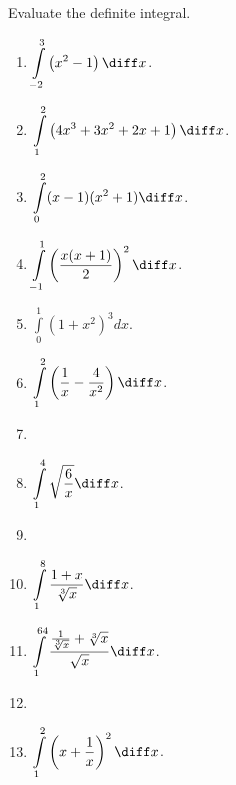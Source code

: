 Evaluate the definite integral.
\begin{multicols}{3}
\begin{enumerate}[ref={\fcProblemRef}]
\item $\displaystyle \int\limits_{-2}^{3} \left(x^2-1 \right)  \diff x$.


\item $\displaystyle \int\limits_{1}^{2} \left(4x^3+3x^2+2x+1\right)  \diff x$.

\item $\displaystyle \int\limits_{0}^{2}(x-1)(x^2+1)  \diff x$.

\item $\displaystyle \int\limits_{-1}^{1} \left( \frac{x(x+1) }{ 2} \right)^2  \diff x$.

\item $\displaystyle \int\limits_{0}^{1}(1+x^2)^3 dx$.

\item $\displaystyle \int \limits_{1}^{2} \left(\frac{1}{x} - \frac{4}{x^2} \right)  \diff x$.

\item 
\item $\displaystyle \int\limits_{1}^{4} \sqrt{ \frac{6 }{x }} \diff x$.

\item 
\item $\displaystyle \int \limits_{1}^{8} \frac{1+x}{ \sqrt[3]{x}} \diff x$.

\item $\displaystyle \int\limits_{1}^{64} \frac{\frac{1}{ \sqrt[3]{x}} +\sqrt[3]{x}}{ \sqrt{x}}\diff x$.

\item 
\item $\displaystyle \int\limits_{1}^{2} \left(x + \frac{1}{x} \right)^2 \diff x$.


\end{enumerate}
\end{multicols}
